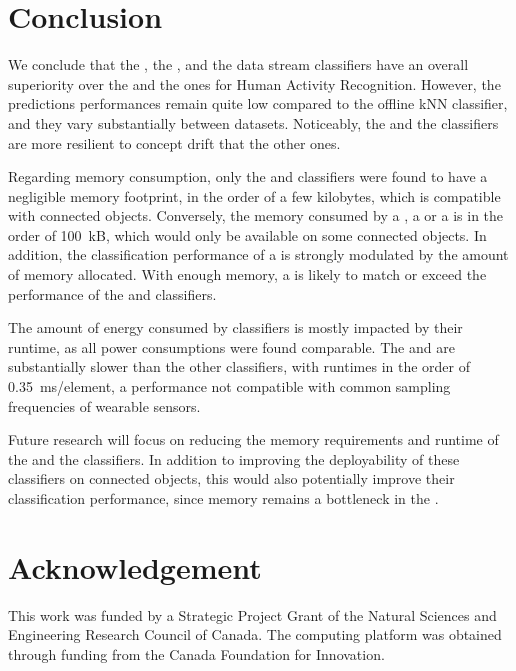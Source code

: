 \section{Conclusion}

We conclude that the \hoeffdingtree, the \mondrianforest, and the
\naivebayes data stream classifiers have an overall superiority over the
\FNN and the \mcnns ones for Human Activity Recognition.  However, the
predictions performances remain quite low compared to the offline kNN classifier, and they vary substantially between datasets. Noticeably, the
\hoeffdingtree and the \mcnns classifiers are more resilient to concept drift that the
other ones.

Regarding memory consumption, only the \mcnns and \naivebayes classifiers
were found to have a negligible memory footprint, in the order of a few
kilobytes, which is compatible with connected objects. Conversely, the
memory consumed by a \mondrianforest, a \FNN or a \hoeffdingtree is in the
order of 100~kB, which would only be available on some connected objects.
In addition, the classification performance of a \mondrianforest is
strongly modulated by the amount of memory allocated. With enough memory, a
\mondrianforest is likely to match or exceed the performance of the
\hoeffdingtree and \naivebayes classifiers.

The amount of energy consumed by classifiers is mostly impacted by their
runtime, as all power consumptions were found comparable. The
\hoeffdingtree and \mondrianforest are substantially slower than the other
classifiers, with runtimes in the order of 0.35~ms/element, a performance not compatible 
with common sampling frequencies of wearable sensors. 

Future research will focus on reducing the memory requirements and runtime
of the \hoeffdingtree and the \mondrianforest classifiers. In addition to
improving the deployability of these classifiers on connected objects, this
would also potentially improve their classification performance, since
memory remains a bottleneck in the \mondrianforest.

\section*{Acknowledgement}
This work was funded by a Strategic Project Grant of the Natural Sciences
and Engineering Research Council of Canada. The computing platform was
obtained through funding from the Canada Foundation for Innovation.
